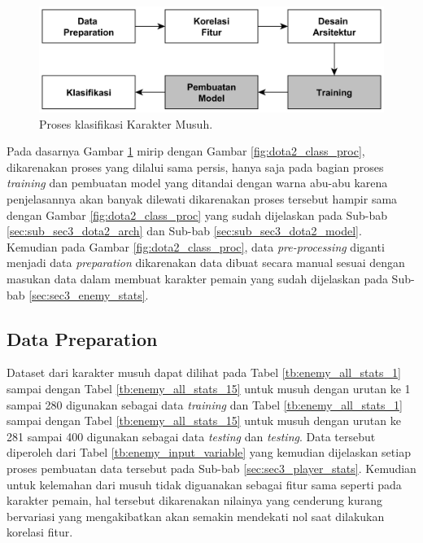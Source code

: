 \begin{figure} [!h] \centering
	\includegraphics[scale=0.035]{img/player_char_nn_classification.png}
	\caption{Proses klasifikasi Karakter Musuh.}
	\label{fig:enemy_class_proc}
\end{figure}

Pada dasarnya Gambar \ref{fig:enemy_class_proc} mirip dengan Gambar \ref{fig:dota2_class_proc}, dikarenakan proses yang dilalui sama persis, hanya saja pada bagian proses \textit{training} dan pembuatan model yang ditandai dengan warna abu-abu karena penjelasannya akan banyak dilewati dikarenakan proses tersebut hampir sama dengan Gambar \ref{fig:dota2_class_proc} yang sudah dijelaskan pada Sub-bab \ref{sec:sub_sec3_dota2_arch} dan Sub-bab \ref{sec:sub_sec3_dota2_model}. Kemudian pada Gambar \ref{fig:dota2_class_proc}, data \textit{pre-processing} diganti menjadi data \textit{preparation} dikarenakan data dibuat secara manual sesuai dengan masukan data dalam membuat karakter pemain yang sudah dijelaskan pada Sub-bab \ref{sec:sec3_enemy_stats}.
\vspace{1ex}

\subsection{Data Preparation}
\label{sec:sub_sec3_enemy_data_prep}
\vspace{1ex}

Dataset dari karakter musuh dapat dilihat pada Tabel \ref{tb:enemy_all_stats_1} sampai dengan Tabel \ref{tb:enemy_all_stats_15} untuk musuh dengan urutan ke 1 sampai 280 digunakan sebagai data \textit{training} dan Tabel \ref{tb:enemy_all_stats_1} sampai dengan Tabel \ref{tb:enemy_all_stats_15} untuk musuh dengan urutan ke 281 sampai 400 digunakan sebagai data \textit{testing} dan \textit{testing}. Data tersebut diperoleh dari Tabel \ref{tb:enemy_input_variable} yang kemudian dijelaskan setiap proses pembuatan data tersebut pada Sub-bab \ref{sec:sec3_player_stats}. Kemudian untuk kelemahan dari musuh tidak diguanakan sebagai fitur sama seperti pada karakter pemain, hal tersebut dikarenakan nilainya yang cenderung kurang bervariasi yang mengakibatkan akan semakin mendekati nol saat dilakukan korelasi fitur.
\vspace{1ex}

